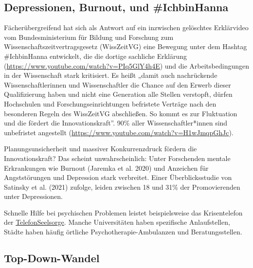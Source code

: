 \documentclass[
  letterpaper,
  DIV=11,
  numbers=noendperiod]{scrreprt}
\begin{document}
\subsection{Depressionen, Burnout, und
\#IchbinHanna}\label{depressionen-burnout-und-ichbinhanna}

Fächerübergreifend hat sich als Antwort auf ein inzwischen gelöschtes
Erklärvideo vom Bundesministerium für Bildung und Forschung zum
Wissenschaftszeitvertragsgesetz (WissZeitVG) eine Bewegung unter dem
Hashtag \#IchbinHanna entwickelt, die die dortige sachliche Erklärung
(\url{https://www.youtube.com/watch?v=PIq5GlY4h4E}) und die
Arbeitsbedingungen in der Wissenschaft stark kritisiert. Es heißt „damit
auch nachrückende Wissenschaftlerinnen und Wissenschaftler die Chance
auf den Erwerb dieser Qualifizierung haben und nicht eine Generation
alle Stellen verstopft, dürfen Hochschulen und Forschungseinrichtungen
befristete Verträge nach den besonderen Regeln des WissZeitVG
abschließen. So kommt es zur Fluktuation und die fördert die
Innovationskraft''. 90\% aller Wissenschaftler*innen sind unbefristet
angestellt (\url{https://www.youtube.com/watch?v=H1wJmqpGhJc}).

Planungsunsicherheit und massiver Konkurrenzdruck fördern die
Innovationskraft? Das scheint unwahrscheinlich: Unter Forschenden
mentale Erkrankungen wie Burnout (Jaremka et al. 2020) und Anzeichen für
Angststörungen und Depression stark verbreitet. Einer Überblicksstudie
von Satinsky et al. (2021) zufolge, leiden zwischen 18 und 31\% der
Promovierenden unter Depressionen.

\begin{tcolorbox}[enhanced jigsaw, left=2mm, colback=white, colframe=quarto-callout-caution-color-frame, opacitybacktitle=0.6, opacityback=0, title=\textcolor{quarto-callout-caution-color}{\faFire}\hspace{0.5em}{Wer hilft?}, toptitle=1mm, coltitle=black, colbacktitle=quarto-callout-caution-color!10!white, titlerule=0mm, bottomtitle=1mm, leftrule=.75mm, breakable, rightrule=.15mm, bottomrule=.15mm, toprule=.15mm, arc=.35mm]

Schnelle Hilfe bei psychischen Problemen leistet beispielsweise das
Krisentelefon der
\href{https://www.telefonseelsorge.de}{TelefonSeelsorge}. Manche
Universitäten haben spezifische Anlaufstellen, Städte haben häufig
örtliche Psychotherapie-Ambulanzen und Beratungsstellen.

\end{tcolorbox}

\subsection{Top-Down-Wandel}\label{top-down-wandel}
\end{document}
